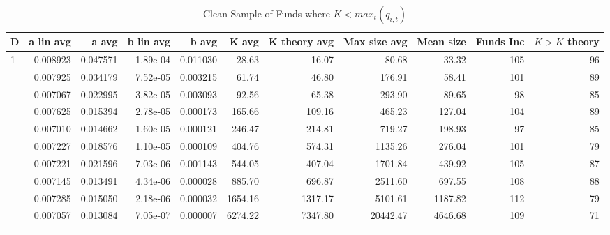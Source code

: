 \documentclass[12pt]{article}
\begin{document}
\begin{landscape}
    \begin{table}[h!]
        \centering
        \begin{threeparttable}
            \caption{\Large Clean Sample of Funds where $K<max_t(q_{i,t})$}
            \label{tab:estimates-deciles-combined-k<max}
            \begin{tabular}{lrrrrrrrrrr}
                \toprule
                D & a lin avg & a avg & b lin avg & b avg & K avg & K theory avg & Max size avg & Mean size & Funds Inc & $K>K$ theory \\
                \midrule
                1 & 0.008923 & 0.047571 & 1.89e-04 & 0.011030 & 28.63 & 16.07 & 80.68 & 33.32 & 105 & 96 \\
                \addlinespace
                2 & 0.007925 & 0.034179 & 7.52e-05 & 0.003215 & 61.74 & 46.80 & 176.91 & 58.41 & 101 & 89 \\
                \addlinespace
                3 & 0.007067 & 0.022995 & 3.82e-05 & 0.003093 & 92.56 & 65.38 & 293.90 & 89.65 & 98 & 85 \\
                \addlinespace
                4 & 0.007625 & 0.015394 & 2.78e-05 & 0.000173 & 165.66 & 109.16 & 465.23 & 127.04 & 104 & 89 \\
                \addlinespace
                5 & 0.007010 & 0.014662 & 1.60e-05 & 0.000121 & 246.47 & 214.81 & 719.27 & 198.93 & 97 & 85 \\
                \addlinespace
                6 & 0.007227 & 0.018576 & 1.10e-05 & 0.000109 & 404.76 & 574.31 & 1135.26 & 276.04 & 101 & 79 \\
                \addlinespace
                7 & 0.007221 & 0.021596 & 7.03e-06 & 0.001143 & 544.05 & 407.04 & 1701.84 & 439.92 & 105 & 87 \\
                \addlinespace
                8 & 0.007145 & 0.013491 & 4.34e-06 & 0.000028 & 885.70 & 696.87 & 2511.60 & 697.55 & 108 & 88 \\
                \addlinespace
                9 & 0.007285 & 0.015050 & 2.18e-06 & 0.000032 & 1654.16 & 1317.17 & 5101.61 & 1187.82 & 112 & 79 \\
                \addlinespace
                10 & 0.007057 & 0.013084 & 7.05e-07 & 0.000007 & 6274.22 & 7347.80 & 20442.47 & 4646.68 & 109 & 71 \\
                \addlinespace
                \bottomrule
            \end{tabular}
            \begin{tablenotes}
                \item[]
            \end{tablenotes}
        \end{threeparttable}
    \end{table}
\end{landscape}
\end{document}
